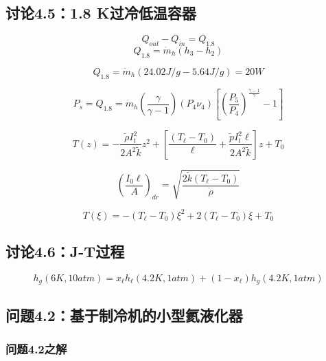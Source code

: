 \subsection{讨论4.5：1.8 K过冷低温容器}

\begin{equation}%
Q_{out}-Q_{in}=Q_{1.8}
\end{equation}
\begin{equation}%
Q_{1.8}=\dot{m}_h(h_3-h_2)
\end{equation}

\begin{equation*}%
Q_{1.8}=\dot{m}_h(24.02J/g-5.64J/g)=20W
\end{equation*}

\begin{equation}%
P_s=Q_{1.8}=\dot{m}_h(\frac{\gamma}{\gamma-1})(P_4\nu_4)[(\frac{P_5}{P_4})^{\frac{\gamma-1}{\gamma}}-1]
\end{equation}

\begin{equation}%
T(z)=-\frac{\tilde{\rho}I_{t}^{2}}{2A^2\tilde{k}}z^2+[\frac{(T_\ell-T_0)}{\ell}+\frac{\tilde{p}I_{t}^2\ell}{2A^2\tilde{k}}]z+T_0
\end{equation}

\begin{equation}%
(\frac{I_0\ell}{A})_{dr}=\sqrt{\frac{2\tilde{k}(T_\ell-T_0)}{\dot{\rho}}}
\end{equation}

\begin{equation}%
T(\xi)=-(T_\ell-T_0)\xi^2+2(T_\ell-T_0)\xi+T_0
\end{equation}

\subsection{讨论4.6：J-T过程}

\begin{equation}%
h_g(6K,10atm)=x_\ell h_\ell(4.2K,1atm)+(1-x_\ell)h_g(4.2K,1atm)
\end{equation}

\subsection{问题4.2：基于制冷机的小型氦液化器}


\subsubsection{问题4.2之解}

